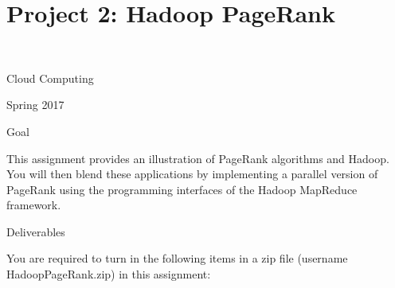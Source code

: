 \section{Project 2: Hadoop PageRank}

\FILENAME\

Cloud Computing

Spring 2017

Goal

This assignment provides an illustration of PageRank algorithms and Hadoop. You will then blend these
applications by implementing a parallel version of PageRank using the programming interfaces of the Hadoop
MapReduce framework.

Deliverables

You are required to turn in the following items in a zip file
(username HadoopPageRank.zip) in this assignment:

